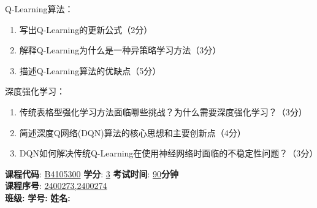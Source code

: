 \documentclass[zihao=5,noanswers]{BHCexam}
\begin{document}
\begin{questions}
\question[10] Q-Learning算法：
\begin{enumerate}
    \item 写出Q-Learning的更新公式（2分）
    \item 解释Q-Learning为什么是一种异策略学习方法（3分）
    \item 描述Q-Learning算法的优缺点（5分）
\end{enumerate}

\question[10] 深度强化学习：
\begin{enumerate}
    \item 传统表格型强化学习方法面临哪些挑战？为什么需要深度强化学习？（3分）
    \item 简述深度Q网络(DQN)算法的核心思想和主要创新点（4分）
    \item DQN如何解决传统Q-Learning在使用神经网络时面临的不稳定性问题？（3分）
\end{enumerate}

\end{questions}



\ifprintanswers
\else
\newpage
{}
\maketitle


\begin{flushleft}
 \qquad\kaishu \textbf{课程代码}: \underline{\hspace{2ex}B4105300\hspace{2ex}} \quad\kaishu \textbf{学分}: \underline{\hspace{5ex}3\hspace{5ex}} \quad \kaishu \textbf{考试时间}: \underline{\hspace{3ex}90\hspace{3ex}}\kaishu \textbf{分钟}\\
 \qquad\kaishu \textbf{课程序号}: \underline{\hspace{25ex}2400273,2400274\hspace{25ex}}\\
 \qquad\vspace{1ex}
 \kaishu \textbf{班级:} \underline{\hspace{15ex}} \quad
 \kaishu \textbf{学号:} \underline{\hspace{15ex}} \quad
 \kaishu \textbf{姓名:} \underline{\hspace{15ex}} \quad
\end{flushleft}
\end{document}
